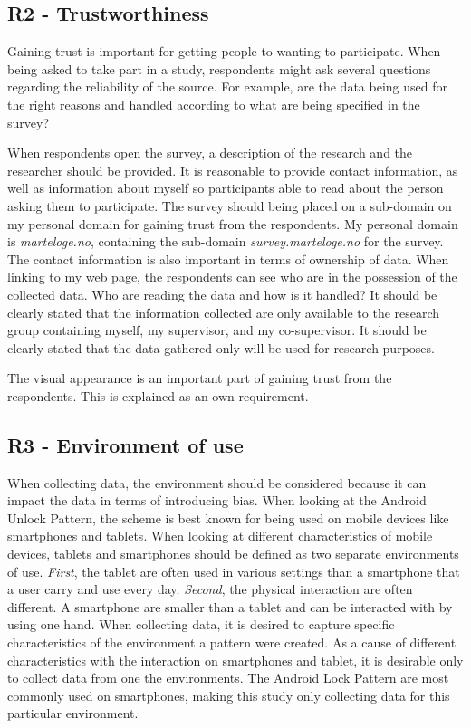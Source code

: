     \subsection*{R2 - Trustworthiness}
    Gaining trust is important for getting people to wanting to participate. When being asked to take part in a study, respondents might ask several questions regarding the reliability of the source. For example, are the data being used for the right reasons and handled according to what are being specified in the survey? 

    When respondents open the survey, a description of the research and the researcher should be provided. It is reasonable to provide contact information, as well as information about myself so participants able to read about the person asking them to participate. The survey should being placed on a sub-domain on my personal domain for gaining trust from the respondents. My personal domain is {\it marteloge.no}, containing the sub-domain {\it survey.marteloge.no} for the survey.  The contact information is also important in terms of ownership of data. When linking to my web page, the respondents can see who are in the possession of the collected data. Who are reading the data and how is it handled? It should be clearly stated that the information collected are only available to the research group containing myself, my supervisor, and my co-supervisor. It should be clearly stated that the data gathered only will be used for research purposes.

    The visual appearance is an important part of gaining trust from the respondents. This is explained as an own requirement. 

    \subsection*{R3 - Environment of use}
    When collecting data, the environment should be considered because it can impact the data in terms of introducing bias. When looking at the Android Unlock Pattern, the scheme is best known for being used on mobile devices like smartphones and tablets. When looking at different characteristics of mobile devices, tablets and smartphones should be defined as two separate environments of use. {\it First}, the tablet are often used in various settings than a smartphone that a user carry and use every day. {\it Second}, the physical interaction are often different. A smartphone are smaller than a tablet and can be interacted with by using one hand. When collecting data, it is desired to capture specific characteristics of the environment a pattern were created. As a cause of different characteristics with the interaction on smartphones and tablet, it is desirable only to collect data from one the environments. The Android Lock Pattern are most commonly used on smartphones, making this study only collecting data for this particular environment.

